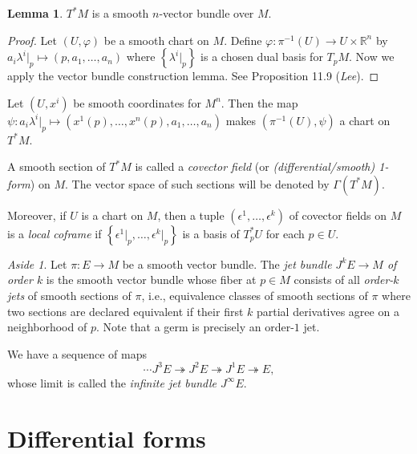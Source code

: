 \documentclass[10pt,letterpaper,cm]{nupset}
\theoremstyle{definition}
\theoremstyle{theorem}
\newtheorem{lemma}[definition]{Lemma}
\theoremstyle{remark}
\newtheorem*{aside}{Aside}
\newcommand{\R}{\mathbb R}
\newcommand{\1}{\mathbf{1}}
\newcommand{\0}{\vec 0}
\begin{document}
\begin{lemma}
$T^{\ast}M$ is a smooth $n$-vector bundle over $M$.
\end{lemma}
\begin{proof}
Let $\left(U, \varphi\right)$ be a smooth chart on $M$. Define $\varphi : \pi^{-1}(U) \to U \times \R^n$ by $a_i \lambda^i\bigr\rvert_p \mapsto \left(p, a_1, \ldots, a_n\right)$ where $\left\{\lambda^i \bigr\rvert_p\right\}$ is a chosen dual basis for $T_pM$. Now we apply the vector bundle construction lemma. See Proposition 11.9 (\textit{Lee}).
\end{proof}


Let $\left(U, x^i\right)$ be smooth coordinates for $M^n$. Then the map $\psi: a_i\lambda^i\bigr\rvert_p \mapsto \left(x^1(p), \ldots, x^n(p), a_1, \ldots, a_n\right)$ makes  $\left(\pi^{-1}(U), \psi\right)$ a chart on $T^{\ast}M$.

\medskip

A smooth section of $T^{\ast}M$ is called a \textit{covector field} (or \textit{(differential/smooth) 1-form}) on $M$. The vector space of such sections will be denoted by $\Gamma(T^{\ast}M)$.

Moreover, if $U$ is a chart on $M$, then a tuple $\left(\epsilon^1, \ldots, \epsilon^k\right)$ of covector fields on $M$ is a \textit{local coframe} if $\left\{\epsilon^1\bigr\rvert_p, \ldots, \epsilon^k\bigr\rvert_p\right\}$ is a basis of $T_p^{\ast}{U}$ for each $p\in U$.

\bigskip

\begin{aside}
Let $\pi : E \to M$ be a smooth vector bundle.  The \textit{jet bundle $J^k{E} \to M$ of order $k$} is the smooth vector bundle whose fiber at $p\in M$ consists of all \textit{order-$k$ jets} of smooth sections of $\pi$, i.e., equivalence classes of smooth sections of $\pi$ where two sections are declared equivalent if their first $k$ partial derivatives agree on a neighborhood of $p$.
Note that a germ is precisely an order-$1$ jet.

We have a sequence of maps
\[
    \cdots J^3 E \twoheadrightarrow J^2 E \twoheadrightarrow J^1 E \twoheadrightarrow E
,\]
whose limit is called the \textit{infinite jet bundle $J^{\infty}{E}$}.
\end{aside}

\section{Differential forms}
\end{document}
